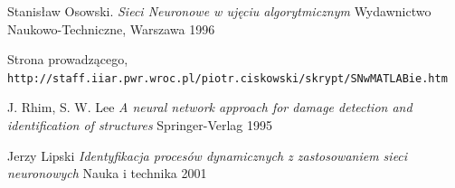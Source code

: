 \documentclass{article}
\begin{document}
\newpage
\begin{thebibliography}{9}

Stanisław Osowski.
\textit{Sieci Neuronowe w ujęciu algorytmicznym}
Wydawnictwo Naukowo-Techniczne, Warszawa 1996

Strona prowadzącego,
\\\texttt{http://staff.iiar.pwr.wroc.pl/piotr.ciskowski/skrypt/SNwMATLABie.htm}

J. Rhim, S. W. Lee
\textit{A neural network approach for damage detection and identification of structures}
Springer-Verlag 1995

Jerzy Lipski
\textit{Identyfikacja procesów dynamicznych z zastosowaniem sieci neuronowych}
Nauka i technika 2001

\end{thebibliography}
\end{document}
